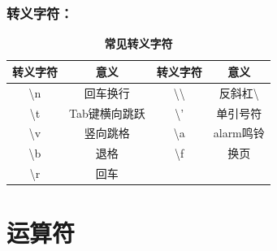 \documentclass[zihao=-4,UTF8]{report}
\begin{document}
\subsubsection{转义字符：}
\begin{table}[H]
    \centering
    \caption{\textbf{常见转义字符}}
    \begin{tabular}{cccc} 
    \toprule
     {转义字符}              &  {意义}       &  {转义字符}                                                 &  {意义}                                     \\ 
    \hline
     {\textbackslash{}n} &  {回车换行}     &  {\textbackslash{}\textbackslash{}}                     &  {反斜杠\textbackslash{}}                  \\
     {\textbackslash{}t} &  {Tab键横向跳跃} &  {\textbackslash{}'}                                    &  {单引号符}                                   \\
     {\textbackslash{}v} &  {竖向跳格}     &  {\textbackslash{}a}                                    &  {alarm鸣铃}                                \\
     {\textbackslash{}b} &  {退格}       & {\textbackslash{}f} &  {换页}  \\
     {\textbackslash{}r} &  {回车}       &                                                                        &                                                          \\
    \bottomrule
    \end{tabular}
\end{table}

\section{运算符}
\end{document}
